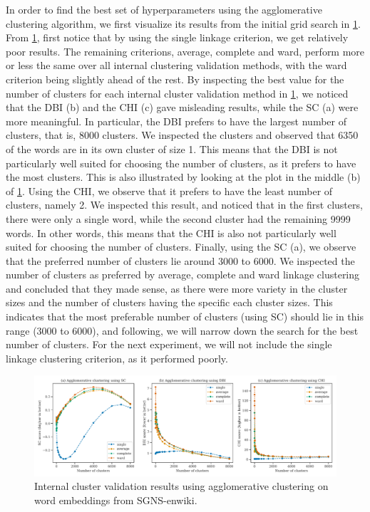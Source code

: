 In order to find the best set of hyperparameters using the agglomerative clustering algorithm, we first visualize its results from the initial grid search in \cref{fig:cluster-analysis-agglomerative-internal-cluster-validation}. From \cref{fig:cluster-analysis-agglomerative-internal-cluster-validation}, first notice that by using the single linkage criterion, we get relatively poor results. The remaining criterions, average, complete and ward, perform more or less the same over all internal clustering validation methods, with the ward criterion being slightly ahead of the rest. By inspecting the best value for the number of clusters for each internal cluster validation method in \cref{fig:cluster-analysis-agglomerative-internal-cluster-validation}, we noticed that the DBI (b) and the CHI (c) gave misleading results, while the SC (a) were more meaningful. In particular, the DBI prefers to have the largest number of clusters, that is, 8000 clusters. We inspected the clusters and observed that 6350 of the words are in its own cluster of size 1. This means that the DBI is not particularly well suited for choosing the number of clusters, as it prefers to have the most clusters. This is also illustrated by looking at the plot in the middle (b) of \cref{fig:cluster-analysis-agglomerative-internal-cluster-validation}. Using the CHI, we observe that it prefers to have the least number of clusters, namely 2. We inspected this result, and noticed that in the first clusters, there were only a single word, while the second cluster had the remaining 9999 words. In other words, this means that the CHI is also not particularly well suited for choosing the number of clusters. Finally, using the SC (a), we observe that the preferred number of clusters lie around 3000 to 6000. We inspected the number of clusters as preferred by average, complete and ward linkage clustering and concluded that they made sense, as there were more variety in the cluster sizes and the number of clusters having the specific each cluster sizes. This indicates that the most preferable number of clusters (using SC) should lie in this range (3000 to 6000), and following, we will narrow down the search for the best number of clusters. For the next experiment, we will not include the single linkage clustering criterion, as it performed poorly.
\begin{figure}[H]
    \centering
    \includegraphics[width=\textwidth]{thesis/figures/cluster-analysis-agglomerative-internal-cluster-validation.pdf}
    \caption{Internal cluster validation results using agglomerative clustering on word embeddings from SGNS-enwiki.}
    \label{fig:cluster-analysis-agglomerative-internal-cluster-validation}
\end{figure}

